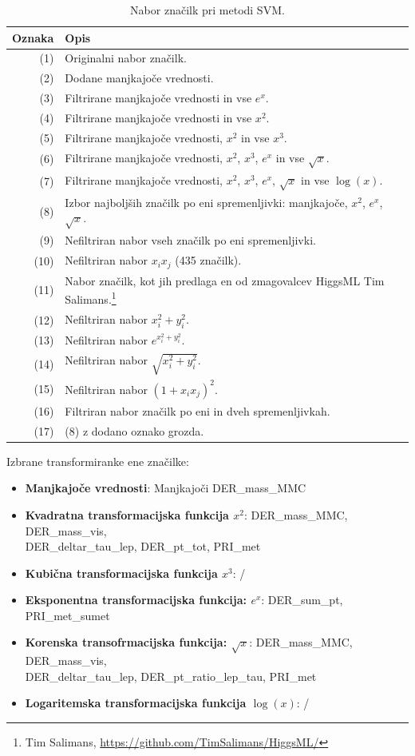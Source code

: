 \documentclass[11pt,a4paper,openany]{book}
\begin{document}
\begin{table}[h!]
	\centering
	\begin{tabular}{r|l}
		\textbf{Oznaka} & \textbf{Opis} \\
		\hline
		(1) & Originalni nabor značilk. \\
		(2) & Dodane manjkajoče vrednosti. \\
		(3) & Filtrirane manjkajoče vrednosti in vse $e^x$. \\
		(4) & Filtrirane manjkajoče vrednosti in vse $x^2$. \\
		(5) & Filtrirane manjkajoče vrednosti, $x^2$ in vse $x^3$. \\
		(6) & Filtrirane manjkajoče vrednosti, $x^2$, $x^3$, $e^x$ in vse $\sqrt{x}$. \\
		(7) & Filtrirane manjkajoče vrednosti, $x^2$, $x^3$, $e^x$, $\sqrt{x}$ in vse $\log(x)$. \\
		(8) & Izbor najboljših značilk po eni spremenljivki: manjkajoče, $x^2$, $e^x$, $\sqrt{x}$. \\
		(9) & Nefiltriran nabor vseh značilk po eni spremenljivki. \\
		(10) & Nefiltriran nabor $x_ix_j$ (435 značilk). \\
		(11) & Nabor značilk, kot jih predlaga en od zmagovalcev HiggsML Tim Salimans.\footnote{Tim Salimans, \url{https://github.com/TimSalimans/HiggsML/}} \\
		(12) & Nefiltriran nabor $x_i^2 + y_i^2$. \\
		(13) & Nefiltriran nabor $e^{x_i^2 + y_i^2}$. \\		
		(14) & Nefiltriran nabor $\sqrt{x_i^2 + y_i^2}$. \\
		(15) & Nefiltriran nabor $(1 + x_ix_j)^2$. \\
		(16) & Filtriran nabor značilk po eni in dveh spremenljivkah. \\
		(17) & (8) z dodano oznako grozda. \\
	\end{tabular}
	\caption{Nabor značilk pri metodi SVM.}	
	\label{tb:feature_sets}
\end{table}
\newpage
Izbrane transformiranke ene značilke:
\begin{itemize}
	\item \textbf{Manjkajoče vrednosti}: Manjkajoči DER\_mass\_MMC
	\item \textbf{Kvadratna transformacijska funkcija $x^2$}: DER\_mass\_MMC, DER\_mass\_vis, \\ 
		DER\_deltar\_tau\_lep, DER\_pt\_tot, PRI\_met
	\item \textbf{Kubična transformacijska funkcija $x^3$}: /
	\item \textbf{Eksponentna transformacijska funkcija: $e^x$}: DER\_sum\_pt, PRI\_met\_sumet
	\item \textbf{Korenska transofrmacijska funkcija: $\sqrt{x}$}: DER\_mass\_MMC, DER\_mass\_vis, \\	DER\_deltar\_tau\_lep, DER\_pt\_ratio\_lep\_tau, PRI\_met
	\item \textbf{Logaritemska transformacijska funkcija $\log(x)$}: /
\end{itemize}
\end{document}
